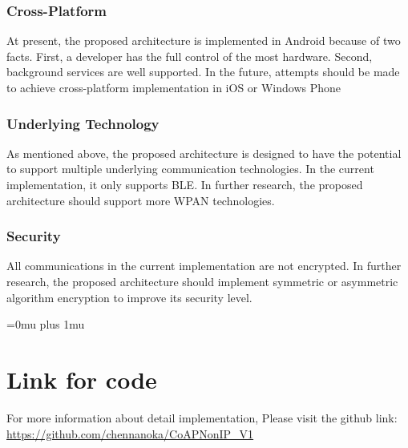 \documentclass{Nan_Thesis}
\begin{document}
\subsection{Cross-Platform}
At present, the proposed architecture is implemented in Android because of two facts. First, a developer has the full control of the most hardware. Second, background services are well supported. In the future, attempts should be made to achieve cross-platform implementation in iOS or Windows Phone
\subsection{Underlying Technology}
As mentioned above, the proposed architecture is designed to have the potential to support multiple underlying communication technologies. In the current implementation, it only supports BLE. In further research, the proposed architecture should support more WPAN technologies.
\subsection{Security}
All communications in the current implementation are not encrypted. In further research, the proposed architecture should implement symmetric or asymmetric algorithm encryption to improve its security level.


 
\Urlmuskip=0mu plus 1mu\relax
{} 



%

\uofsappendix

\chapter{Link for code}
For more information about detail implementation, Please visit the github link: \url{https://github.com/chennanoka/CoAPNonIP_V1}


\end{document}
